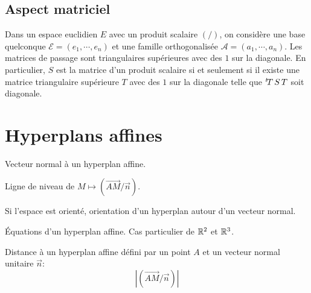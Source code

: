\clearpage
\subsection{Aspect matriciel}
Dans un espace euclidien $E$ avec un produit scalaire $(/)$, on considère une base quelconque $\mathcal E = (e_1,\cdots,e_n)$ et une famille orthogonalisée $\mathcal A =(a_1,\cdots,a_n)$. Les matrices de passage sont triangulaires supérieures avec des $1$ sur la diagonale.\newline
En particulier, $S$ est la matrice d'un produit scalaire si et seulement si il existe une matrice triangulaire supérieure $T$ avec des $1$ sur la diagonale telle que  $\mathstrut^t\! T\,S\, T$ soit diagonale.
\clearpage
\section{Hyperplans affines}
Vecteur normal à un hyperplan affine.

Ligne de niveau de $M\mapsto (\overrightarrow{AM}/\overrightarrow{n})$.

Si l'espace est orienté, orientation d'un hyperplan autour d'un vecteur normal.

\'Equations d'un hyperplan affine. Cas particulier de $\mathbb{R}^2$ et $\mathbb{R}^3$.

Distance à un hyperplan affine défini par un point $A$ et un vecteur normal unitaire $\overrightarrow{n}$:
\begin{displaymath}
  \left| (\overrightarrow{AM}/\overrightarrow{n})\right|
\end{displaymath}



